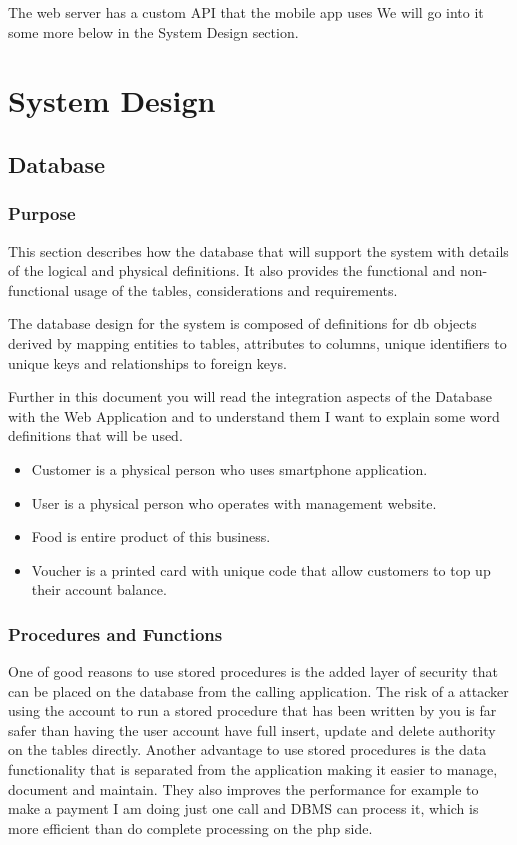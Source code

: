 The web server has a custom API that the mobile app uses
We will go into it some more below in the System Design section. 

\chapter{System Design}	%
  \section{Database}
    \subsection{Purpose}

This section describes how the database that will support the system with details of the logical and physical definitions. It also provides the functional and non-functional usage of the tables, considerations and requirements.

The database design for the system is composed of definitions for db objects derived by mapping entities to tables, attributes to columns, unique identifiers to unique keys and relationships to foreign keys. 

Further in this document you will read the integration aspects of the Database with the Web Application and to understand them I want to explain some word definitions that will be used.
\\
\begin{itemize}
\item Customer is a physical person who uses smartphone application.

\item User is a physical person who operates with management website.

\item Food is entire product of this business.

\item Voucher is a printed card with unique code that allow customers to top up their account balance.
\end{itemize}
    \subsection{Procedures and Functions}
One of good reasons to use stored procedures is the added layer of security that can be placed on the database from the calling application. The risk of a attacker using the account to run a stored procedure that has been written by you is far safer than having the user account have full insert, update and delete authority on the tables directly. Another advantage to use stored procedures is the data functionality that is separated from the application making it easier to manage, document and maintain. They also improves the performance for example to make a payment I am doing just one call and DBMS can process it, which is more efficient than do complete processing on the php side.
\\

